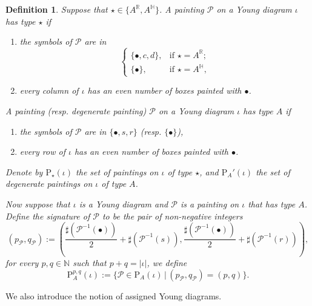 \documentclass[12pt, a4paper]{amsart}
\numberwithin{equation}{section}
\newtheorem{defn}[thm]{Definition}
\newcommand{\BH}{{\mathbb {H}}}
\newcommand{\BN}{{\mathbb {N}}}
\newcommand{\BR}{{\mathbb {R}}}
\newcommand{\CP}{{\mathcal {P}}}
\newcommand{\set}[2]{\{#1\,|\,#2\}}
\begin{document}
\begin{defn}
   Suppose that $\star \in \{A^{\BR}, A^{\BH}\}$. A painting $\CP$ on a Young diagram $\iota$ has type $\star$ if
   \begin{enumerate}
      \item the symbols of $\CP$ are in
            $$\left\{
               \begin{array}{lr}
                  \{\bullet,c,d\}, & \textrm{if $\star = A^{\BR}$};\\                   
                  \{\bullet\},     & \textrm{if $\star = A^{\BH}$},
               \end{array}
               \right.
            $$
      \item every column of $\iota$ has an even number of boxes painted with $\bullet$.
   \end{enumerate}

   A painting (resp. degenerate painting) $\CP$ on a Young diagram $\iota$ has type $A$ if
   \begin{enumerate}
      \item the symbols of $\CP$ are in $\{\bullet, s ,r\}$ (resp. $\{\bullet\}$),
      \item every row of $\iota$ has an even number of boxes painted with $\bullet$.
   \end{enumerate}

   Denote by $\mathrm{P}_{\star}(\iota)$ the set of paintings on $\iota$ of type $\star$, and $\mathrm{P}_{A}'(\iota)$ the set of degenerate paintings on $\iota$ of type $A$.

   Now suppose that $\iota$ is a Young diagram and $\CP$ is a painting on $\iota$ that has type $A$. Define the signature of $\CP$ to be the pair of non-negative integers
   \begin{equation}
    (p_{\CP}, q_{\CP}) := (\frac{\sharp(\CP^{-1}(\bullet))}{2} + \sharp(\CP^{-1}(s)), \frac{\sharp(\CP^{-1}(\bullet))}{2}+ \sharp(\CP^{-1}(r))),
   \end{equation}
   for every $p,q \in \BN$ such that $p + q = |\iota|$, we define
   \begin{equation}
        \mathrm{P}_{A}^{p,q}(\iota) := \set{\CP \in \mathrm{P}_{A}(\iota)}{(p_{\CP},q_{\CP}) = (p,q)}.       
   \end{equation}
\end{defn}


We also introduce the notion of assigned Young diagrams.
\end{document}
